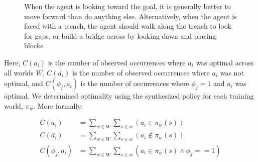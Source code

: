 \documentclass[letterpaper]{article}
\begin{document}
\begin{figure}[H]
\centering
{}
\label{fig:example_affs}
\caption{When the agent is looking toward the goal, it is generally better to move forward than do anything else. Alternatively, when the agent is faced with a trench, the agent should walk along the trench to look for gaps, or build a bridge across by looking down and placing blocks.}
\end{figure}

Here, $C(a_i)$ is the number of observed occurrences where $a_i$ was optimal across all worlds $W$,
$C(\bar{a_i})$ is the number of observed occurrences where $a_i$ was not optimal,
and $C(\phi_j, a_i)$ is the number of occurrences where $\phi_j=1$ and $a_i$ was optimal.
We determined optimality using the synthesized policy for each training world, $\pi_w$. More formally:

\begin{align}
C(a_i) &= \sum_{w \in W} \sum_{s \in w} (a_i \in \pi_w(s)) \\
C(\bar{a_i}) &= \sum_{w \in W} \sum_{s \in w} (a_i \not \in \pi_w(s) ) \\
C(\phi_j, a_i) &= \sum_{w \in W} \sum_{s \in w} (a_i  \in \pi_w(s) \wedge \phi_j == 1)
\end{align}
\end{document}
